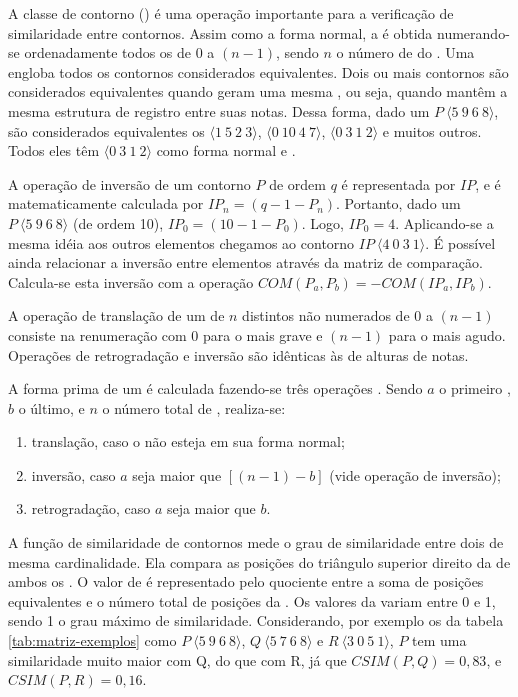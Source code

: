 A classe de contorno () é uma operação importante para a
verificação de similaridade entre contornos. Assim como a forma
normal, a  é obtida numerando-se ordenadamente todos os
 de $0$ a $(n-1)$, sendo $n$ o número de
 do . Uma  engloba todos os
contornos considerados equivalentes. Dois ou mais contornos são
considerados equivalentes quando geram uma mesma ,
ou seja, quando mantêm a mesma estrutura de registro entre suas
notas. Dessa forma, dado um 
$P\:\langle5\:9\:6\:8\rangle$, são considerados equivalentes os
 $\langle1\:5\:2\:3\rangle$, $\langle0\:10\:4\:7\rangle$,
$\langle0\:3\:1\:2\rangle$ e muitos outros. Todos eles têm
$\langle0\:3\:1\:2\rangle$ como forma normal e .

A operação de inversão de um contorno $P$ de ordem $q$ é representada
por $IP$, e é matematicamente calculada por
$IP_n=(q-1-P_n)$. Portanto, dado um 
$P\:\langle5\:9\:6\:8\rangle$ (de ordem 10), $IP_0=(10-1-P_0)$. Logo,
$IP_0=4$. Aplicando-se a mesma idéia aos outros elementos chegamos ao
contorno $IP\:\langle4\:0\:3\:1\rangle$. É possível ainda relacionar a
inversão entre elementos através da matriz de comparação. Calcula-se
esta inversão com a operação $COM(P_a,P_b)=-COM(IP_a,IP_b)$.

A operação de translação de um  de $n$ 
distintos não numerados de $0$ a $(n-1)$ consiste na renumeração com
$0$ para o  mais grave e $(n-1)$ para o mais
agudo. Operações de retrogradação e inversão são idênticas às de
alturas de notas.

A forma prima de um  é calculada fazendo-se três operações
\cite{marvin.ea87:relating}. Sendo $a$ o primeiro , $b$
o último, e $n$ o número total de , realiza-se:
\begin{enumerate}
\item translação, caso o  não esteja em sua forma normal;
\item inversão, caso $a$ seja maior que $[(n-1) - b]$ (vide operação
  de inversão);
\item retrogradação, caso $a$ seja maior que $b$.
\end{enumerate}

A função de similaridade de contornos  mede o grau de
similaridade entre dois  de mesma cardinalidade. Ela
compara as posições do triângulo superior direito da
 de ambos os . O valor de  é
representado pelo quociente entre a soma de posições equivalentes e o
número total de posições da . Os valores da
 variam entre 0 e 1, sendo 1 o grau máximo de
similaridade. Considerando, por exemplo os  da tabela
\ref{tab:matriz-exemplos} como $P\:\langle5\:9\:6\:8\rangle$,
$Q\:\langle5\:7\:6\:8\rangle$ e $R\:\langle3\:0\:5\:1\rangle$, $P$ tem
uma similaridade muito maior com Q, do que com R, já que
$CSIM(P,Q)=0,83$, e $CSIM(P,R)=0,16$.

